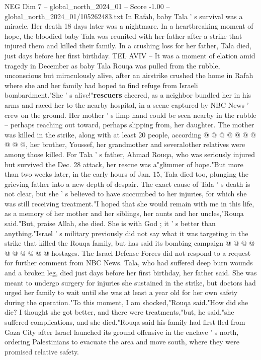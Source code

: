 \begin{textsample}{NEG Dim 7 – global\_north\_2024\_01 – Score -1.00 – global\_north\_2024\_01/105262483.txt}  \label{ex:f7_neg_266}
In Rafah, baby Tala ' s survival was a miracle.
Her death 18 days later was a nightmare.
In a heartbreaking moment of hope, the bloodied baby Tala was reunited with her father after a strike that injured them and killed their family.
In a crushing loss for her father, Tala died, just days before her first birthday.
TEL AVIV -- It was a moment of elation amid tragedy in December as baby Tala Rouqa was pulled from the rubble, unconscious but miraculously alive, after an airstrike crushed the home in Rafah where she and her family had hoped to find refuge from Israeli bombardment."She ' s alive!"\textbf{rescuers} cheered, as a neighbor bundled her in his arms and raced her to the nearby hospital, in a scene captured by NBC News ' crew on the ground.
Her mother ' s limp hand could be seen nearby in the rubble -- perhaps reaching out toward, perhaps slipping from, her daughter.
The mother was killed in the strike, along with at least 20 people, according @ @ @ @ @ @ @ @ @ @, her brother, Youssef, her grandmother and severalother relatives were among those killed.
For Tala ' s father, Ahmad Rouqa, who was seriously injured but survived the Dec. 28 attack, her rescue was a"glimmer of hope."But more than two weeks later, in the early hours of Jan. 15, Tala died too, plunging the grieving father into a new depth of despair.
The exact cause of Tala ' s death is not clear, but she ' s believed to have succumbed to her injuries, for which she was still receiving treatment."I hoped that she would remain with me in this life, as a memory of her mother and her siblings, her aunts and her uncles,"Rouqa said."But, praise Allah, she died.
She is with God ; it ' s better than anything."Israel ' s military previously did not say what it was targeting in the strike that killed the Rouqa family, but has said its bombing campaign @ @ @ @ @ @ @ @ @ @ hostages.
The Israel Defense Forces did not respond to a request for further comment from NBC News.
Tala, who had suffered deep burn wounds and a broken leg, died just days before her first birthday, her father said.
She was meant to undergo surgery for injuries she sustained in the strike, but doctors had urged her family to wait until she was at least a year old for her own safety during the operation."To this moment, I am shocked,"Rouqa said."How did she die?
I thought she got better, and there were treatments,"but, he said,"she suffered complications, and she died."Rouqa said his family had first fled from Gaza City after Israel launched its ground offensive in the enclave ' s north, ordering Palestinians to evacuate the area and move south, where they were promised relative safety.

\end{textsample}
